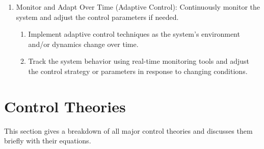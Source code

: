 \documentclass{article}
\begin{document}
\begin{enumerate}
    \item Monitor and Adapt Over Time (Adaptive Control): Continuously monitor the system and adjust the control parameters if needed.
        \begin{enumerate}[label=\roman*.]
            \item Implement adaptive control techniques as the system's environment and/or dynamics change over time.
            \item Track the system behavior using real-time monitoring tools and adjust the control strategy or parameters in response to changing conditions.
        \end{enumerate}
\end{enumerate}

\newpage

\section{Control Theories}
This section gives a breakdown of all major control theories and discusses them briefly with their equations.
\end{document}
